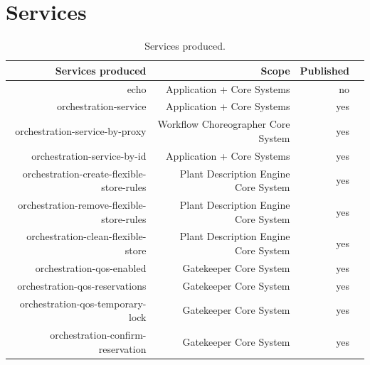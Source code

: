 \documentclass[a4paper]{arrowhead}
\begin{document}
\newpage

\section{Services}
\label{sec:services}

\begin{table}[ht!]
  \centering
  \caption{Services produced. }
  \label{tab:services}
  \begin{tabular}{|r|r|r|r|}
    \hline
    \rowcolor{gray!33}\textbf{Services produced} & \textbf{Scope} & \textbf{Published} \\
    \hline
 
    echo & Application + Core Systems & no  \\ \hline
    orchestration-service & Application + Core Systems & yes \\ \hline
    orchestration-service-by-proxy & Workflow Choreographer Core System & yes \\ \hline
    orchestration-service-by-id & Application + Core Systems & yes \\ \hline
    orchestration-create-flexible-store-rules & Plant Description Engine Core System & yes \\ \hline
    orchestration-remove-flexible-store-rules & Plant Description Engine Core System & yes \\ \hline
    orchestration-clean-flexible-store & Plant Description Engine Core System & yes \\ \hline
    orchestration-qos-enabled & Gatekeeper Core System & yes \\ \hline
    orchestration-qos-reservations & Gatekeeper Core System & yes \\ \hline
    orchestration-qos-temporary-lock & Gatekeeper Core System & yes \\ \hline
    orchestration-confirm-reservation & Gatekeeper Core System & yes \\ \hline
  \end{tabular}
\end{table}
\end{document}
